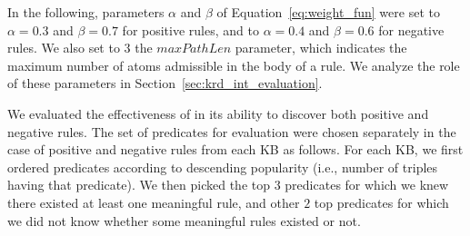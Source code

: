 In the following, parameters $\alpha$ and $\beta$ of Equation~\ref{eq:weight_fun} were set to  $\alpha=0.3$ and $\beta=0.7$ for positive rules, and to $\alpha=0.4$ and $\beta=0.6$ for negative rules. 
We also set to $3$ the $maxPathLen$ parameter, which indicates the maximum number of atoms 
admissible in the body of a rule.
We analyze the role of these parameters in Section~\ref{sec:krd_int_evaluation}. 

We evaluated the effectiveness of \krd in its ability to discover both positive and negative rules. The set of predicates for evaluation were chosen separately in the case of positive and negative rules from each KB as follows.
For each KB, we first ordered predicates according to descending popularity (i.e., number of triples having that predicate). We then picked the top $3$ predicates for which we knew there existed at least one meaningful rule, and other $2$ top predicates for which we did not know whether some meaningful rules existed or not. 

